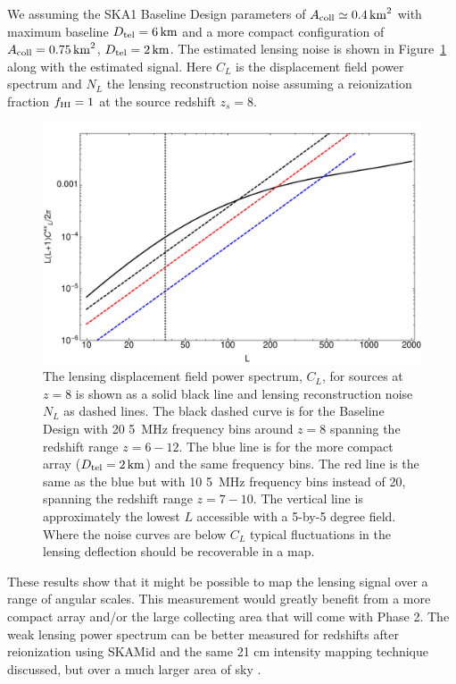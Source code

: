 \documentclass{PoS}
\begin{document}
We assuming the SKA1 Baseline Design \cite{Dewdney:2013} parameters of $A_{\rm coll} \simeq 0.4  \, {\rm km}^2$ with maximum baseline $D_{\rm tel}=6 \, {\rm km}$ and a more compact configuration of  $A_{\rm coll} = 0.75 \, {\rm km}^2$, $D_{\rm tel}=2 \, {\rm km}$. 
The estimated lensing noise is shown in Figure~\ref{fig:CLNL} along with the estimated signal.  
Here $C_L$ is the displacement field power spectrum and $N_L$ the lensing reconstruction noise assuming a reionization fraction $f_{\rm HI}=1$ at the source redshift $z_s=8$.
\begin{figure}[h]
\centerline{
\includegraphics[scale=0.45]{tomographic_SKA_kappaPS.pdf}
}
\caption{The lensing displacement field power spectrum, $C_L$, for sources at $z=8$ is shown as a solid black line and lensing reconstruction noise $N_L$ as dashed lines.  The black dashed curve is for the Baseline Design with 20 5~MHz frequency bins around $z=8$ spanning the redshift range $z=6-12$.   The blue line is for the more compact array ($D_{\rm tel}=2 \, {\rm km}$) and the same frequency bins.  The red line is the same as the blue but with 10 5~MHz frequency bins instead of 20, spanning the redshift range $z = 7-10$.  The vertical line is approximately the lowest $L$ accessible with a 5-by-5 degree field.  Where the noise curves are below $C_L$ typical fluctuations in the lensing deflection should be recoverable in a map. }
\label{fig:CLNL}
\end{figure}

These results show that it might be possible to map the lensing signal over a range of angular scales.  This measurement would greatly benefit from a more compact array and/or the large collecting area that will come with Phase 2.  The weak lensing power spectrum can be better measured for redshifts after reionization using SKA\-Mid and the same 21 cm intensity mapping technique discussed, but over a much larger area of sky \cite{PourtsidouMetcalf:2014}.
\end{document}

